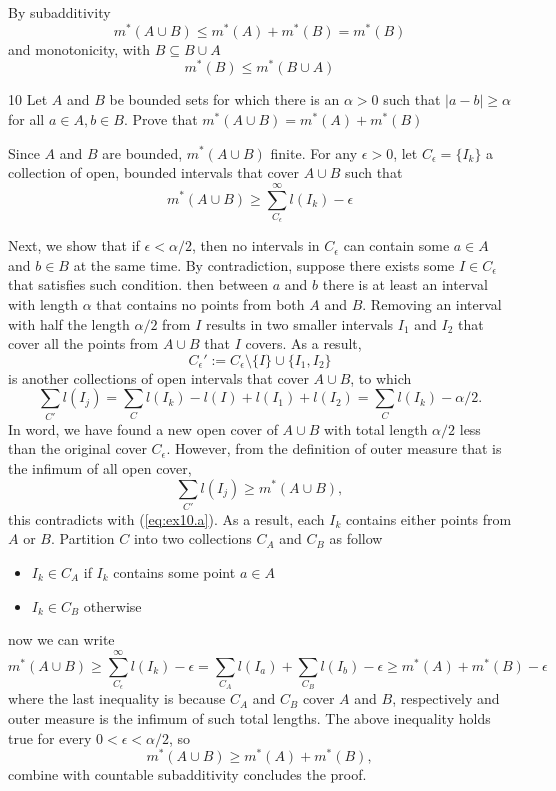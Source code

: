 \begin{solution}
    By subadditivity
    \[m^*(A\cup B ) \leq m^*(A) + m^*(B) = m^*(B)\]
    and monotonicity, with $B\subseteq B\cup A$
    \[m^*(B)\leq m^*(B \cup A)\]
\end{solution}

\begin{exercise} {10}
    Let $A$ and $B$ be bounded sets for which there is an $\alpha>0$ such that $|a-b|\geq \alpha$ for all $a\in A, b\in B$. Prove that $m^*(A\cup B)=m^*(A) + m^*(B)$
\end{exercise}
\begin{solution} 
    Since $A$ and $B$ are bounded, $m^*(A\cup B)$ finite.
    For any $\epsilon>0$, let $C_\epsilon=\{I_k\}$ a collection of open, bounded intervals that cover $A\cup B$ such that
    \begin{equation}\label{eq:ex10.a}
        m^*(A\cup B) \geq \sum^\infty_{C_\epsilon} l(I_k) - \epsilon
    \end{equation}

    Next, we show that if $\epsilon < \alpha/2$, then no intervals in $C_\epsilon$ can contain some $a\in A$ and $b \in B$ at the same time.
    By contradiction, suppose there exists some $I\in C_\epsilon$ that satisfies such condition.
    then between $a$ and $b$ there is at least an interval with length $\alpha$ that contains no points from both $A$ and $B$. 
    Removing an interval with half the length $\alpha/2$ from $I$ results in two smaller intervals $I_1$ and $I_2$ that cover all the points from $A\cup B$ that $I$ covers. As a result,
    \[C_\epsilon' := C_\epsilon \setminus \{I\} \cup \{I_1, I_2\}\]
    is another collections of open intervals that cover $A\cup B$, to which 
    \[\sum_{C'}l(I_j) = \sum_{C}l(I_k) - l(I) + l(I_1) + l(I_2) = \sum_{C}l(I_k) - \alpha/2. \]
    In word, we have found a new open cover of $A\cup B$ with total length $\alpha/2$ less than the original cover $C_\epsilon$. However, from the definition of outer measure that is the infimum of all open cover,
    \[\sum_{C'}l(I_j) \geq m^*(A\cup B),\]
    this contradicts with (\ref{eq:ex10.a}). As a result, each $I_k$ contains either points from $A$ or $B$. Partition $C$ into two collections $C_A$ and $C_B$ as follow 
    \begin{itemize}
        \item $I_k \in C_A$ if $I_k$ contains some point $a\in A$
        \item $I_k \in C_B$ otherwise
    \end{itemize}
    now we can write 
    \[m^*(A\cup B) \geq \sum^\infty_{C_\epsilon} l(I_k) - \epsilon = \sum_{C_A} l(I_a) + \sum_{C_B} l(I_b) - \epsilon \geq m^*(A) + m^*(B) - \epsilon\]
    where the last inequality is because $C_A$ and $C_B$ cover $A$ and $B$, respectively and outer measure is the infimum of such total lengths. The above inequality holds true for every $0 < \epsilon < \alpha/2$, so
    \[m^*(A\cup B) \geq m^*(A) + m^*(B),\]
    combine with countable subadditivity concludes the proof.


\end{solution}
